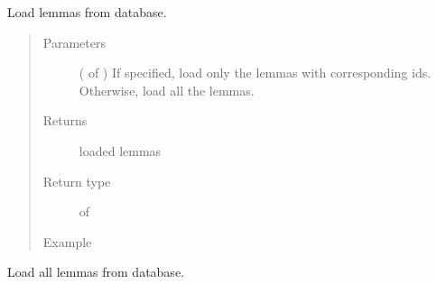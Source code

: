 \documentclass[letterpaper,10pt,english]{sphinxmanual}
\begin{document}
\begin{fulllineitems}
\label{\detokenize{load:loacore.load.lemma_load.load_lemmas}}
Load lemmas from database.
\begin{quote}\begin{description}
\item[{Parameters}] \leavevmode
{} ( of ) \textendash{} If specified, load only the lemmas with corresponding ids. Otherwise, load all the lemmas.

\item[{Returns}] \leavevmode
loaded lemmas

\item[{Return type}] \leavevmode
{} of 

\item[{Example}] \leavevmode
\end{description}\end{quote}

Load all lemmas from database.

%
\begin{sphinxVerbatim}[commandchars=\\\{\}]
   
  
\PYG{p}{[}\PYG{p}{]}
\end{sphinxVerbatim}

\end{fulllineitems}

\end{document}
